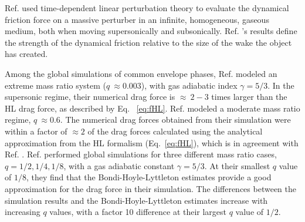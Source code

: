 Ref. \cite{1999ApJ...513..252O} used time-dependent linear perturbation theory to evaluate the dynamical friction force on a massive perturber in an infinite, homogeneous, gaseous medium, both when moving  supersonically and subsonically. Ref. \cite{1999ApJ...513..252O}'s results define the strength of the dynamical friction relative to the size of the wake the object has created.

Among the global simulations of common envelope phases, Ref. \cite{Staff:2016} modeled an extreme mass ratio system ($q~\approx 0.003$), with gas adiabatic index $\gamma = 5/3$. In the supersonic regime, their numerical drag force is $\approx~2-3$ times larger than the HL drag force, as described by Eq. ~\ref{eq:fHL}. Ref. \cite{Reichardt:2019} modeled a moderate mass ratio regime, $q~\approx 0.6$. The numerical drag forces obtained from their simulation were within a factor of $\approx 2$ of the drag forces calculated using the analytical approximation from the HL formalism (Eq.~\ref{eq:fHL}), which is in agreement with Ref. \cite{Staff:2016}. Ref. \cite{Chamandy:2019psk} performed global simulations for three different mass ratio cases, $q = 1/2, 1/4, 1/8$, with a gas adiabatic constant $\gamma = 5/3$. At their smallest $q$ value of $1/8$, they find that the Bondi-Hoyle-Lyttleton estimates provide a good approximation for the drag force in their simulation. The differences between the simulation results and the Bondi-Hoyle-Lyttleton estimates increase with increasing $q$ values, with a factor 10 difference at their largest $q$ value of $1/2$. 

